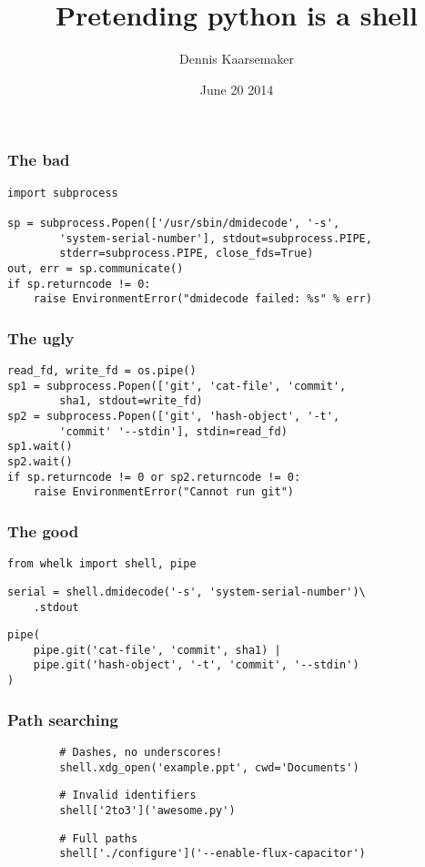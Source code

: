 \documentclass{beamer}
\title{Pretending python is a shell}
\author{Dennis Kaarsemaker}
\date{June 20 2014}
\begin{document}
{
\begin{frame}
    \titlepage
\end{frame}
}

\begin{frame}[fragile]
    \frametitle{The bad}
    \begin{verbatim}
import subprocess

sp = subprocess.Popen(['/usr/sbin/dmidecode', '-s', 
        'system-serial-number'], stdout=subprocess.PIPE, 
        stderr=subprocess.PIPE, close_fds=True)
out, err = sp.communicate()
if sp.returncode != 0:
    raise EnvironmentError("dmidecode failed: %s" % err)
    \end{verbatim}
\end{frame}

\begin{frame}[fragile]
    \frametitle{The ugly}
    \begin{verbatim}
read_fd, write_fd = os.pipe()
sp1 = subprocess.Popen(['git', 'cat-file', 'commit', 
        sha1, stdout=write_fd)
sp2 = subprocess.Popen(['git', 'hash-object', '-t', 
        'commit' '--stdin'], stdin=read_fd)
sp1.wait()
sp2.wait()
if sp.returncode != 0 or sp2.returncode != 0:
    raise EnvironmentError("Cannot run git")
    \end{verbatim}
\end{frame}

\begin{frame}[fragile]
    \frametitle{The good}
    \begin{verbatim}
from whelk import shell, pipe
    \end{verbatim}
    \pause
    \begin{verbatim}
serial = shell.dmidecode('-s', 'system-serial-number')\
    .stdout
    \end{verbatim}
    \pause
    \begin{verbatim}
pipe(
    pipe.git('cat-file', 'commit', sha1) |
    pipe.git('hash-object', '-t', 'commit', '--stdin')
)
    \end{verbatim}
\end{frame}

\begin{frame}[fragile]
    \frametitle{Path searching}
    \pause
    \begin{verbatim}
        # Dashes, no underscores!
        shell.xdg_open('example.ppt', cwd='Documents')
    \end{verbatim}
    \pause
    \begin{verbatim}
        # Invalid identifiers
        shell['2to3']('awesome.py')
    \end{verbatim}
    \pause
    \begin{verbatim}
        # Full paths
        shell['./configure']('--enable-flux-capacitor')
    \end{verbatim}
\end{frame}
\end{document}
